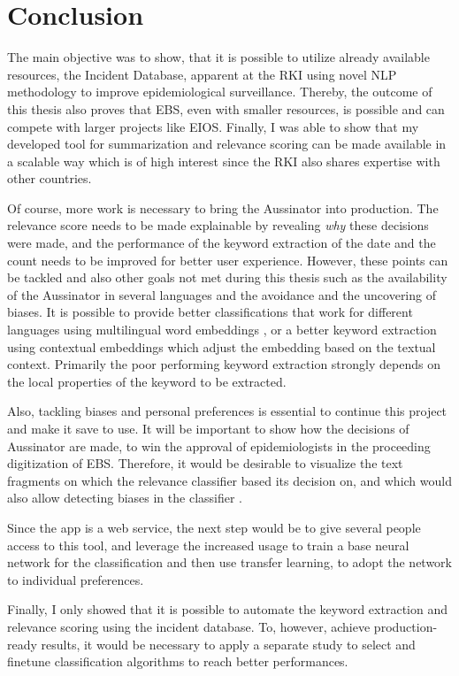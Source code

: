 \chapter{Conclusion}
  The main objective was to show, that it is possible to utilize already available resources, the Incident Database, apparent at the RKI using novel NLP methodology to improve epidemiological surveillance.
  Thereby, the outcome of this thesis also proves that EBS, even with smaller resources, is possible and can compete with larger projects like EIOS.
  Finally, I was able to show that my developed tool for summarization and relevance scoring can be made available in a scalable way which is of high interest since the RKI also shares expertise with other countries.

  Of course, more work is necessary to bring the Aussinator into production.
  The relevance score needs to be made explainable by revealing \emph{why} these decisions were made, and the performance of the keyword extraction of the date and the count needs to be improved for better user experience.
  However, these points can be tackled and also other goals not met during this thesis such as the availability of the Aussinator in several languages and the avoidance and the uncovering of biases.
  It is possible to provide better classifications that work for different languages using multilingual word embeddings \citep{Chen2018}, or a better keyword extraction using contextual embeddings \citep{Devlin2018, Peters2018} which adjust the embedding based on the textual context.
  Primarily the poor performing keyword extraction strongly depends on the local properties of the keyword to be extracted.

  Also, tackling biases and personal preferences is essential to continue this project and make it save to use.
 It will be important to show how the decisions of Aussinator are made,  to win the approval of epidemiologists in the proceeding digitization of EBS.
  Therefore, it would be desirable to visualize the text fragments on which the relevance classifier based its decision on, and which would also allow detecting biases in the classifier \citep{Arras2017}.

  Since the app is a web service, the next step would be to give several people access to this tool, and leverage the increased usage to train a base neural network for the classification and then use transfer learning, to adopt the network to individual preferences.

  Finally, I only showed that it is possible to automate the keyword extraction and relevance scoring using the incident database.
  To, however, achieve production-ready results, it would be necessary to apply a separate study to select and finetune classification algorithms to reach better performances.
